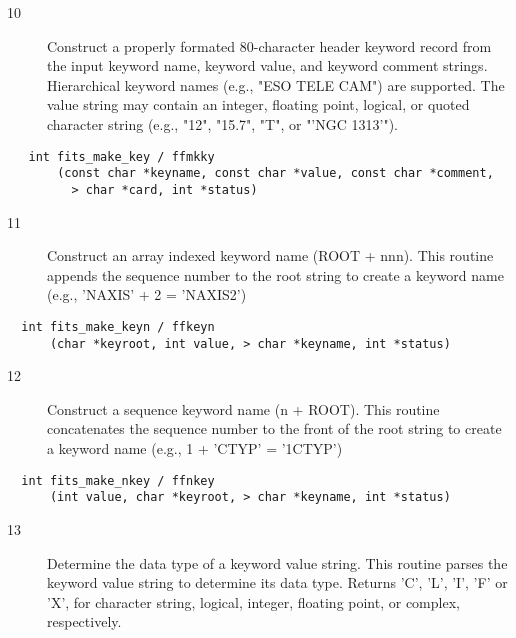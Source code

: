 \documentclass[11pt]{book}
\begin{document}
\begin{description}
\item[10] Construct a properly formated 80-character header keyword record from the
    input keyword name, keyword value, and keyword comment strings.
    Hierarchical keyword names (e.g., "ESO TELE CAM") are supported.
    The value string may contain an integer, floating point, logical, or
    quoted character string (e.g., "12", "15.7", "T",
    or "'NGC 1313'").  \label{ffmkky}
\end{description}

\begin{verbatim}
   int fits_make_key / ffmkky
       (const char *keyname, const char *value, const char *comment,
         > char *card, int *status)
\end{verbatim}

\begin{description}
\item[11] Construct an array indexed keyword name (ROOT + nnn).
    This routine appends the sequence number to the root string to create
   a keyword name (e.g., 'NAXIS' + 2 = 'NAXIS2') \label{ffkeyn}
\end{description}

\begin{verbatim}
  int fits_make_keyn / ffkeyn
      (char *keyroot, int value, > char *keyname, int *status)
\end{verbatim}

\begin{description}
\item[12]  Construct a sequence keyword name (n + ROOT).
    This routine concatenates the sequence number to the front of the
   root string to create a keyword name (e.g., 1 + 'CTYP' = '1CTYP') \label{ffnkey}
\end{description}

\begin{verbatim}
  int fits_make_nkey / ffnkey
      (int value, char *keyroot, > char *keyname, int *status)
\end{verbatim}

\begin{description}
\item[13] Determine the data type of a keyword value string. This routine
    parses the keyword value string  to determine its data type.
    Returns 'C', 'L', 'I', 'F' or 'X', for character string, logical,
   integer, floating point, or complex, respectively. \label{ffdtyp}
\end{description}
\end{document}
